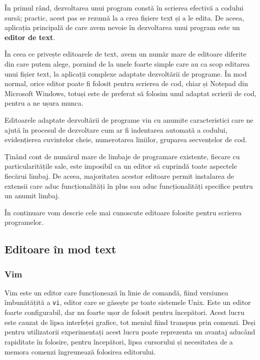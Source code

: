 În primul rând, dezvoltarea unui program constă în scrierea efectivă a codului sursă;
practic, acest pas se rezumă la a crea fișiere text și a le edita.
De aceea, aplicația principală de care avem nevoie în dezvoltarea unui program este un \textbf{editor de text}.

În ceea ce privește editoarele de text, avem un număr mare de editoare diferite din care putem alege, pornind de la unele foarte simple care au ca scop editarea unui fișier text, la aplicații complexe adaptate dezvoltării de programe.
În mod normal, orice editor poate fi folosit pentru scrierea de cod, chiar și Notepad din Microsoft Windows, totuși este de preferat să folosim unul adaptat scrierii de cod, pentru a ne ușura munca.

Editoarele adaptate dezvoltării de programe vin cu anumite caracteristici care ne ajută în procesul de dezvoltare cum ar fi indentarea automată a codului, evidențierea cuvintelor cheie, numerotarea liniilor, gruparea secvențelor de cod.

Ținând cont de numărul mare de limbaje de programare existente, fiecare cu particularitățile sale, este imposibil ca un editor să cuprindă toate aspectele fiecărui limbaj.
De aceea, majoritatea acestor editoare permit instalarea de extensii care aduc funcționalități în plus sau aduc funcționalități specifice pentru un anumit limbaj.

În continuare vom descrie cele mai cunoscute editoare folosite pentru scrierea programelor.

\subsection{Editoare în mod text}
\label{sec:appdev:dev-stages:editor}

\subsubsection{Vim}
\label{sec:appdev:dev-stages:editor:vim}

Vim este un editor care funcționează în linie de comandă, fiind versiunea îmbunătățită a \texttt{vi}, editor care se găsește pe toate sistemele Unix.
Este un editor foarte configurabil, dar nu foarte ușor de folosit pentru începători.
Acest lucru este cauzat de lipsa interfeței grafice, tot meniul fiind transpus prin comenzi.
Deși pentru utilizatorii experimentați acest lucru poate reprezenta un avantaj aducând rapiditate în folosire, pentru începători, lipsa cursorului și necesitatea de a memora comenzi îngreunează folosirea editorului.

